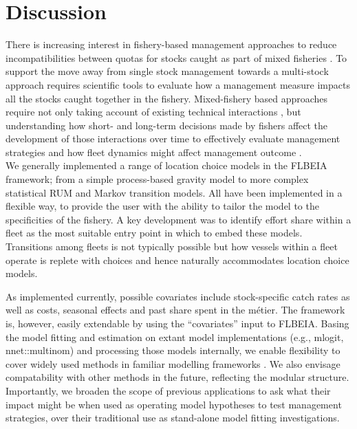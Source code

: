 \documentclass[12pt, halfline, a4paper]{ouparticle}
\begin{document}
\section{Discussion}
\label{dis}

There is increasing interest in fishery-based management approaches to reduce
incompatibilities between quotas for stocks caught as part of mixed fisheries
\citep{Ulrich2016, Garcia2020}. To support the move away from single stock
management towards a multi-stock approach requires scientific tools to evaluate
how a management measure impacts all the stocks caught together in the fishery.
Mixed-fishery based approaches require not only taking account of existing
technical interactions \citep{Ulrich2011, Garcia2017}, but understanding how
short- and long-term decisions made by fishers affect the development of those
interactions over time to effectively evaluate management strategies and how
fleet dynamics might affect management outcome \citep{Marchal2013}. \\

We generally implemented a range of location choice models in the FLBEIA
framework; from a simple process-based gravity model to more complex
statistical RUM and Markov transition models. All have been implemented in a
flexible way, to provide the user with the ability to tailor the model to the
specificities of the fishery. A key development was to identify effort share
within a fleet as the most suitable entry point in which to embed these models.
Transitions among fleets is not typically possible but how vessels within a
fleet operate is replete with choices and hence naturally accommodates location
choice models. 

As implemented currently, possible covariates include stock-specific catch
rates as well as costs, seasonal effects and past share spent in the métier.
The framework is, however, easily extendable by using the ``covariates'' input
to FLBEIA. Basing the model fitting and estimation on extant model
implementations (e.g., mlogit, nnet::multinom) and processing those models
internally, we enable flexibility to cover widely used methods in familiar
modelling frameworks \citep{Venables2009, Dichmont2006, Hynes2016}. We also
envisage compatability with other methods in the future, reflecting the modular
structure. Importantly, we broaden the scope of previous applications to ask
what their impact might be when used as operating model hypotheses to test
management strategies, over their traditional use as stand-alone model fitting
investigations.\\
\end{document}
